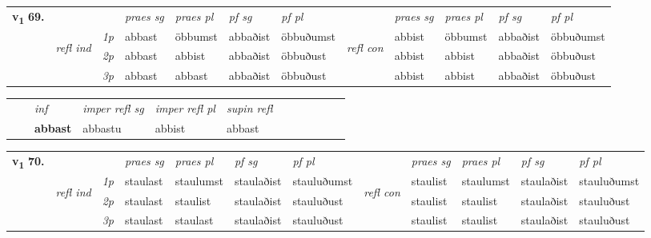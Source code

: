 \begin{tabular}{llllllllllll} \toprule
\multirow{4}{*}{{{\textbf{v{\textsubscript{1}}} \Large{\textbf{69.}}}}}  & &   &  \textit{praes sg}  & \textit{praes pl}  &\textit{pf sg} & \textit{pf pl} &  &  \textit{praes sg}  & \textit{praes pl}  & \textit{pf sg} & \textit{pf pl } \\*
	\cmidrule{4-7} \cmidrule{9-12}
 &\multirow{3}{*}{\begin{turn}{90}\textit{refl ind}\end{turn}} & {\textit{1p}} & abbast & öbbumst    & abbaðist & öbbuðumst & \multirow{3}{*}{\begin{turn}{90}\textit{refl con}\end{turn}}  &abbist & öbbumst & abbaðist & öbbuðumst\\*
 &&  {\textit{2p}} &  abbast  & abbist   & abbaðist & öbbuðust & &abbist & abbist & abbaðist & öbbuðust \\*
& &  {\textit{3p}} & abbast & abbast   & abbaðist & öbbuðust & & abbist & abbist& abbaðist & öbbuðust  \\*
\cmidrule{4-7} \cmidrule{9-12}
\end{tabular}


\begin{tabular}{llllllllllll}
 & & \textit{inf}   & \textit{imper refl sg} & \textit{imper refl pl}   & \textit{supin refl}      \\*
  & & \textbf{abbast}    & abbastu & abbist   & abbast  \\*
\cmidrule{1-12}
\end{tabular}



\begin{tabular}{llllllllllll} \toprule
\multirow{4}{*}{{{\textbf{v{\textsubscript{1}}} \Large{\textbf{70.}}}}}  & &   &  \textit{praes sg}  & \textit{praes pl}  &\textit{pf sg} & \textit{pf pl} &  &  \textit{praes sg}  & \textit{praes pl}  & \textit{pf sg} & \textit{pf pl } \\*
	\cmidrule{4-7} \cmidrule{9-12}
 &\multirow{3}{*}{\begin{turn}{90}\textit{refl ind}\end{turn}} & {\textit{1p}} & staulast & staulumst    & staulaðist & stauluðumst & \multirow{3}{*}{\begin{turn}{90}\textit{refl con}\end{turn}}  &staulist & staulumst & staulaðist & stauluðumst\\*
 &&  {\textit{2p}} &  staulast  & staulist   & staulaðist & stauluðust & &staulist & staulist & staulaðist & stauluðust \\*
& &  {\textit{3p}} & staulast & staulast   & staulaðist & stauluðust & & staulist & staulist& staulaðist & stauluðust  \\*
\cmidrule{4-7} \cmidrule{9-12}
\end{tabular}


